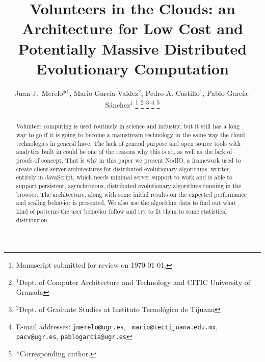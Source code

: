 \documentclass[journal,onecolumn]{IEEEtran}
\begin{document}
\title{Volunteers in the Clouds: an Architecture for Low Cost and
  Potentially Massive Distributed Evolutionary Computation}



\author{Juan-J.~Merelo*$^1$, Mario Garc\'ia-Valdez$^2$, Pedro A. Castillo$^1$, Pablo Garc\'ia-S\'anchez$^1$
\thanks{Manuscript submitted for review on \today.}%
\thanks{$^1$Dept. of Computer Architecture and Technology and CITIC University of Granada}%
\thanks{$^2$Dept. of Graduate Studies at Instituto Tecnol\'ogico de Tijuana}%
\thanks{E-mail addresses: {\tt jmerelo@ugr.es}, {\tt
    mario@tectijuana.edu.mx}, {\tt pacv@ugr.es}, {\tt pablogarcia@ugr.es}}%
\thanks{*Corresponding author.}%
}

\maketitle

\begin{abstract}
Volunteer computing is used routinely in science and industry, but it
still has a long way to go if it is going to become a mainstream technology in the
same way the cloud technologies in general have. The lack of general
purpose and open source tools
with analytics built in could be one of the reasons why this is so, as
well as the lack of proofs of concept. That is why in this paper we
present {\sf NodIO}, a framework used to create client-server architectures for distributed
evolutionary algorithms, written entirely in JavaScript, which needs
minimal server support to work and is able to support persistent,
asynchronous, distributed evolutionary algorithms running in the
browser.  The architecture, along with some initial results on the
expected performance and scaling
behavior is presented. We also use the algorithm data to
find out what kind of patterns the user behavior follow and try to fit
them to some statistical distribution.
\end{abstract}
\end{document}
